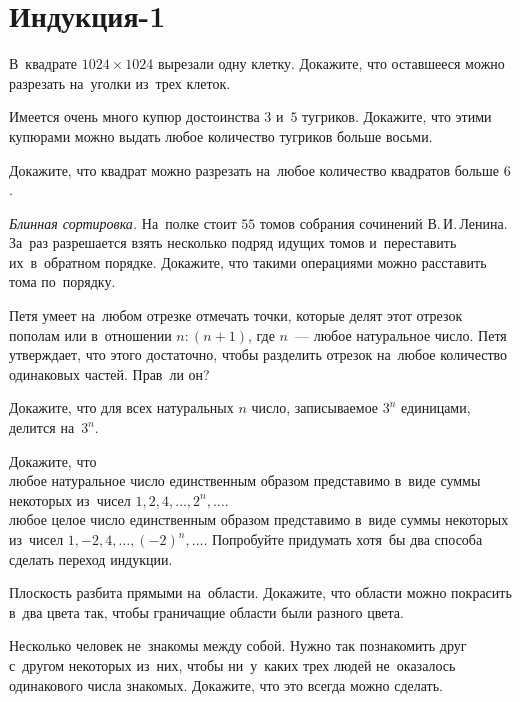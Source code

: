 
\section*{Индукция-1}


\begin{problems}

\item
В~квадрате $1024 \times 1024$ вырезали одну клетку.
Докажите, что оставшееся можно разрезать на~уголки из~трех клеток.

\item
Имеется очень много купюр достоинства $3$ и~$5$ тугриков.
Докажите, что этими купюрами можно выдать любое количество тугриков больше
восьми.

\item
Докажите, что квадрат можно разрезать на~любое количество квадратов больше $6$.

\item\emph{Блинная сортировка.}
На~полке стоит $55$ томов собрания сочинений В.\,И.\,Ленина.
За~раз разрешается взять несколько подряд идущих томов и~переставить
их~в~обратном порядке.
Докажите, что такими операциями можно расставить тома по~порядку.

\item
Петя умеет на~любом отрезке отмечать точки, которые делят этот отрезок пополам
или в~отношении $n : (n + 1)$, где $n$~--- любое натуральное число.
Петя утверждает, что этого достаточно, чтобы разделить отрезок на~любое
количество одинаковых частей.
Прав~ли он?

\item
Докажите, что для всех натуральных $n$ число, записываемое $3^n$ единицами,
делится на~$3^n$.

\item
Докажите, что
\\
\subproblem
любое натуральное число единственным образом представимо в~виде суммы некоторых
из~чисел $1, 2, 4, \ldots, 2^n, \ldots$.
\\
\subproblem
любое целое число единственным образом представимо в~виде суммы некоторых
из~чисел $1, -2, 4, \ldots, (-2)^n, \ldots$.
Попробуйте придумать хотя~бы два способа сделать переход индукции.

\item
Плоскость разбита прямыми на~области.
Докажите, что области можно покрасить в~два цвета так, чтобы граничащие области
были разного цвета.

\item
Несколько человек не~знакомы между собой.
Нужно так познакомить друг с~другом некоторых из~них, чтобы ни~у~каких трех
людей не~оказалось одинакового числа знакомых.
Докажите, что это всегда можно сделать.

\end{problems}

